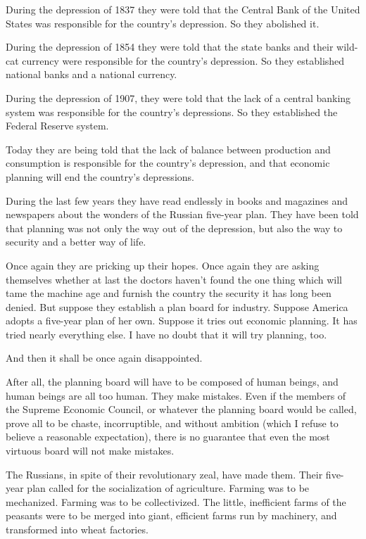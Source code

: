 \documentclass{book}
\begin{document}
During the depression of 1837 they were told that the Central Bank of the United States was responsible for the country’s depression. So they abolished it.

During the depression of 1854 they were told that the state banks and their wild-cat currency were responsible for the country’s depression. So they established national banks and a national currency.

During the depression of 1907, they were told that the lack of a central banking system was responsible for the country’s depressions. So they established the Federal Reserve system.

Today they are being told that the lack of balance between production and consumption is responsible for the country’s depression, and that economic planning will end the country’s depressions.

During the last few years they have read endlessly in books and magazines and newspapers about the wonders of the Russian five-year plan. They have been told that planning was not only the way out of the depression, but also the way to security and a better way of life.

Once again they are pricking up their hopes. Once again they are asking themselves whether at last the doctors haven’t found the one thing which will tame the machine age and furnish the country the security it has long been denied. But suppose they establish a plan board for industry. Suppose America adopts a five-year plan of her own. Suppose it tries out economic planning. It has tried nearly everything else. I have no doubt that it will try planning, too.

And then it shall be once again disappointed.

After all, the planning board will have to be composed of human beings, and human beings are all too human. They make mistakes. Even if the members of the Supreme Economic Council, or whatever the planning board would be called, prove all to be chaste, incorruptible, and without ambition (which I refuse to believe a reasonable expectation), there is no guarantee that even the most virtuous board will not make mistakes.

The Russians, in spite of their revolutionary zeal, have made them. Their five-year plan called for the socialization of agriculture. Farming was to be mechanized. Farming was to be collectivized. The little, inefficient farms of the peasants were to be merged into giant, efficient farms run by machinery, and transformed into wheat factories.
\end{document}

